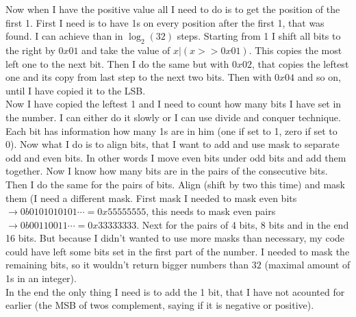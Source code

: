 \documentclass[a4paper]{article}
\begin{document}
\noindent Now when I have the positive value all I need to do is to get the position of the first 1. 
First I need is to have 1s on every position after the first 1, that was found. 
I can achieve than in $\log_{2}(32)$ steps. Starting from 1
I shift all bits to the right by $0x01$ and take the value of $x | (x >> 0x01)$. 
This copies the most left one
to the next bit. Then I do the same but with $0x02$, that copies the leftest one and its copy from
last step to the next two bits. Then with $0x04$ and so on, until I have copied it to the LSB.  \\
\noindent Now I have copied the leftest 1 and I need to count how many bits I have set in the number.
I can either do it slowly or I can use divide and conquer technique. Each bit has information how
many 1s are in him (one if set to 1, zero if set to 0). Now what I do is to align bits, that
I want to add and use mask to separate odd and even bits. In other words I move even bits under
odd bits and add them together. Now I know how many bits are in the pairs of the consecutive bits. 
Then I do the same for the pairs of bits. Align (shift by two this time) and mask them (I need
a different mask. First mask I needed to mask even bits $\rightarrow 0b0101010101\cdots = 0x55555555$,
this needs to mask even pairs $\rightarrow 0b00110011\cdots = 0x33333333$.
Next for the pairs of 4 bits, 8 bits and in the end 16 bits. But because I didn't wanted to use
more masks than necessary, my code could have left some bits set in the first part of the number. 
I needed to mask the remaining bits, so it wouldn't return bigger numbers than $32$ (maximal
amount of 1s in an integer).
\\

\noindent In the end the only thing I need is to add the 1 bit, that I have not acounted for earlier 
(the MSB of twos complement, saying if it is negative or positive).  \\

\newpage
\end{document}
